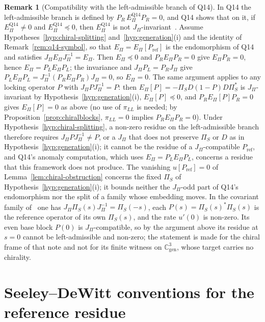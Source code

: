 \documentclass[11pt]{article}
\theoremstyle{definition}
\newtheorem{remark}{Remark}
\newcommand{\EPi}{E_\Pi}
\newcommand{\PiS}{\Pi_S}
\begin{document}
    \begin{remark}[Compatibility with the left-admissible branch of Q14]
      \label{rem:q14-left}
      In Q14 the left-admissible branch is defined by $P_R\,\EPi^{\mathrm{Q14}}P_R=0$, and Q14 shows that on it, if
      $\EPi^{\mathrm{Q14}}\neq0$ and $\EPi^{\mathrm{Q14}}\preceq0$, then $\EPi^{\mathrm{Q14}}$ is not
      $J_\Pi$-invariant~\cite{Beau2026q14}.
      Assume Hypotheses~\ref{hyp:chiral-splitting} and~\ref{hyp:generation}(i) and the identity of
      Remark~\ref{rem:q14-symbol}, so that $\EPi=\EPi[P_{\mathrm{ref}}]$ is the endomorphism of Q14 and satisfies
      $J_\Pi\EPi J_\Pi^{-1}=\EPi$.
      Then $\EPi\preceq0$ and $P_R\EPi P_R=0$ give $\EPi P_R=0$, hence $\EPi=P_L\EPi P_L$; the invariance and
      $J_\Pi P_L=P_R J_\Pi$ give $P_L\EPi P_L=J_\Pi^{-1}(P_R\EPi P_R)J_\Pi=0$, so $\EPi=0$.
      The same argument applies to any locking operator $P$ with $J_\Pi PJ_\Pi^{-1}=P$: then
      $\EPi[P]=-\PiS D(1-P)D\PiS^{*}$ is $J_\Pi$-invariant by Hypothesis~\ref{hyp:generation}(i), $\EPi[P]\preceq0$, and
      $P_R\EPi[P]P_R=0$ gives $\EPi[P]=0$ as above (no use of $\pi_{LL}$ is needed; by
      Proposition~\ref{prop:chiralblocks}, $\pi_{LL}=0$ implies $P_R\EPi P_R=0$).
      Under Hypothesis~\ref{hyp:chiral-splitting}, a non-zero residue on the left-admissible branch therefore requires $J_\Pi PJ_\Pi^{-1}\neq P$, or a
      $J_\Pi$ that does not preserve $\PiS$ or $D$ as in Hypothesis~\ref{hyp:generation}(i); it cannot be the
      residue of a $J_\Pi$-compatible $P_{\mathrm{ref}}$, and Q14's anomaly computation, which uses
      $\EPi=P_L\EPi P_L$, concerns a residue that this framework does not produce.
      The vanishing $u[P_{\mathrm{ref}}]=0$ of Lemma~\ref{lem:chiral-obstruction} concerns the fixed $\PiS$ of
      Hypothesis~\ref{hyp:generation}(i); it bounds neither the $J_\Pi$-odd part of Q14's endomorphism nor the split
      of a family whose embedding moves.
      In the covariant family of~\cite{Beau2026ebj} one has $J_\Pi\PiS(s)J_\Pi^{-1}=\PiS(-s)$, each
      $P(s)=\PiS(s)^{*}\PiS(s)$ is the reference operator of its own $\PiS(s)$, and the rate $u'(0)$ is non-zero.
      Its even base block $P(0)$ is $J_\Pi$-compatible, so by the argument above its residue at $s=0$ cannot be
      left-admissible and non-zero; the statement is made for the chiral frame of that note and not for its finite witness on
      $\mathbb C^3_{\mathrm{gen}}$, whose target carries no chirality.
    \end{remark}

  \section{Seeley--DeWitt conventions for the reference residue}
    \label{sec:conventions}
\end{document}
